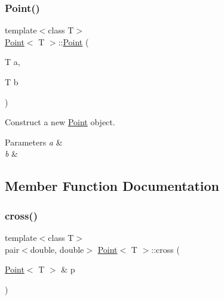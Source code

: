 \subsubsection{\texorpdfstring{Point()}{Point()}\hspace{0.1cm}{\footnotesize\ttfamily [2/2]}}
{\footnotesize\ttfamily template$<$class T$>$ \\
\mbox{\hyperlink{classPoint}{Point}}$<$ T $>$\+::\mbox{\hyperlink{classPoint}{Point}} (\begin{DoxyParamCaption}\item[{T}]{a,  }\item[{T}]{b }\end{DoxyParamCaption})\hspace{0.3cm}{\ttfamily [inline]}}



Construct a new \mbox{\hyperlink{classPoint}{Point}} object. 


\begin{DoxyParams}{Parameters}
{\em a} & \\
\hline
{\em b} & \\
\hline
\end{DoxyParams}

\begin{DoxyCode}{0}

\end{DoxyCode}


\subsection{Member Function Documentation}
\mbox{\label{classPoint_a79b5e5f4d1e341cacfc6a5fa84eb80ee}} 
\subsubsection{\texorpdfstring{cross()}{cross()}}
{\footnotesize\ttfamily template$<$class T$>$ \\
pair$<$double, double$>$ \mbox{\hyperlink{classPoint}{Point}}$<$ T $>$\+::cross (\begin{DoxyParamCaption}\item[{\mbox{\hyperlink{classPoint}{Point}}$<$ T $>$ \&}]{p }\end{DoxyParamCaption})\hspace{0.3cm}{\ttfamily [inline]}}



